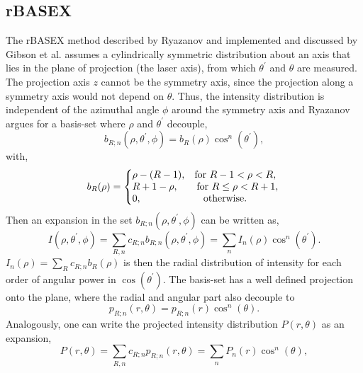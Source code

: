 \documentclass[12pt]{article}
\begin{document}
\subsection{rBASEX}
The rBASEX method described by Ryazanov \cite{ryazanov_development_2012} and implemented and discussed by Gibson et al. \cite{gibson_stephen_pyabelpyabel_2022} assumes a cylindrically symmetric distribution about an axis that lies in the plane of projection (the laser axis), from which $\theta^\prime$ and $\theta$ are measured. The projection axis $z$ cannot be the symmetry axis, since the projection along a symmetry axis would not depend on $\theta$. Thus, the intensity distribution is independent of the azimuthal angle $\phi$ around the symmetry axis and Ryazanov argues for a basis-set where $\rho$ and $\theta^\prime$ decouple,
\begin{equation*}
    b_{R;n}(\rho,\theta^\prime,\phi)=b_{R}(\rho)\cos^n(\theta^\prime),
\end{equation*}
with,
\begin{equation*}
    b_R(\rho)=\left\{
     \begin{array}{@{}l@{\thinspace}l}
       \rho-(R-1),\hspace{3mm}\text{for }R-1<\rho<R,\\
       R+1-\rho,\hspace{6.5mm}\text{for }R\leq\rho<R+1,\\
       0,\hspace{22mm}\text{otherwise.}\\
     \end{array}
   \right.
\end{equation*}
Then an expansion in the set $b_{R;n}(\rho,\theta^\prime,\phi)$ can be written as,
\begin{equation*}
    I(\rho,\theta^\prime,\phi)=\sum_{R,n}c_{R;n}b_{R;n}(\rho,\theta^\prime,\phi)=\sum_{n}I_n(\rho)\cos^n(\theta^\prime).
\end{equation*}
$I_n(\rho)=\sum_{R}c_{R;n}b_R(\rho)$ is then the radial distribution of intensity for each order of angular power in $\cos(\theta^\prime)$. The basis-set has a well defined projection onto the plane, where the radial and angular part also decouple to
\begin{equation*}
    p_{R;n}(r,\theta)=p_{R;n}(r)\cos^n(\theta).
\end{equation*}
Analogously, one can write the projected intensity distribution $P(r,\theta)$ as an expansion,
\begin{equation*}
    P(r,\theta)=\sum_{R,n}c_{R;n}p_{R;n}(r,\theta)=\sum_{n}P_n(r)\cos^n(\theta),
\end{equation*}
\end{document}

